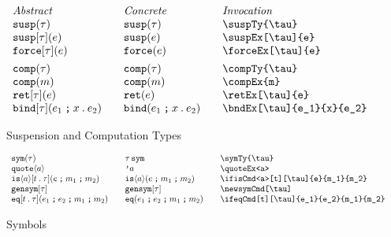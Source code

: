 \documentclass[11pt]{article}
\begin{document}
\begin{figure}

  \begin{small}
    \begin{displaymath}
      \begin{array}{l@{\qquad}l@{\qquad}l@{\qquad}l}
        \textit{Abstract} & \textit{Concrete} & \textit{Invocation} \\
        \suspTy{\tau}           & \suspTy*{\tau}           & \verb|\suspTy{\tau}|           \\
        \suspEx[\tau]{e}        & \suspEx*[\tau]{e}        & \verb|\suspEx[\tau]{e}|        \\
        \forceEx[\tau]{e}   & \forceEx*[\tau]{e}   & \verb|\forceEx[\tau]{e}|   \\[1ex]

        \compTy{\tau}           & \compTy*{\tau}           & \verb|\compTy{\tau}|           \\
        \compEx{m}              & \compEx*{m}              & \verb|\compEx{m}|              \\
        \retEx[\tau]{e}         & \retEx*[\tau]{e}         & \verb|\retEx[\tau]{e}|         \\
        \bndEx[\tau]{e_1}{x}{e_2} & \bndEx*[\tau]{e_1}{x}{e_2} & \verb|\bndEx[\tau]{e_1}{x}{e_2}|
    \end{array}
    \end{displaymath}
  \end{small}

  \caption{Suspension and Computation Types}
  \label{fig:comp-susp}
\end{figure}

\begin{figure}
  
  \begin{small}
    \begin{displaymath}
      \begin{array}{l@{\qquad}l@{\qquad}l@{\qquad}l}
        \symTy{\tau}               & \symTy*{\tau}              & \verb|\symTy{\tau}|                \\
        \quoteEx<a>                & \quoteEx*<a>               & \verb|\quoteEx<a>|                 \\
        \ifisCmd<a>[t][\tau]{e}{m_1}{m_2} & \ifisCmd*<a>{e}{m_1}{m_2}  & \verb|\ifisCmd<a>[t][\tau]{e}{m_1}{m_2}| \\
        \newsymCmd[\tau]  & \newsymCmd*[\tau] & \verb|\newsymCmd[\tau]| \\
        \ifeqCmd[t][\tau]{e_1}{e_2}{m_1}{m_2} & \ifeqCmd*{e_1}{e_2}{m_1}{m_2} & \verb|\ifeqCmd[t][\tau]{e_1}{e_2}{m_1}{m_2}| \\
      \end{array}
    \end{displaymath}
  \end{small}

  \caption{Symbols}
  \label{fig:sym}
\end{figure}
\end{document}
